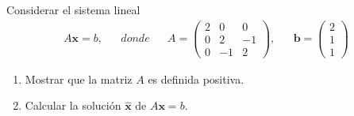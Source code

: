 \documentclass[12pt]{book}
\begin{document}
\eje Considerar el sistema lineal
\begin{align*}
    A\bm{x}=b, && donde && A=\begin{pmatrix}
    2 & 0 & 0\\
    0 & 2 & -1\\
    0 & -1 & 2
    \end{pmatrix}, && \bm{b}=\begin{pmatrix}
    2\\
    1\\
    1
    \end{pmatrix}
\end{align*}
\renewcommand{\labelenumi}{(\alph{enumi})}
\begin{enumerate}
    \item Mostrar que la matriz $A$ es definida positiva.
    \item Calcular la solución $\bm{\hat{x}}$ de $A\bm{x}=b$.
\end{enumerate}
\end{document}
